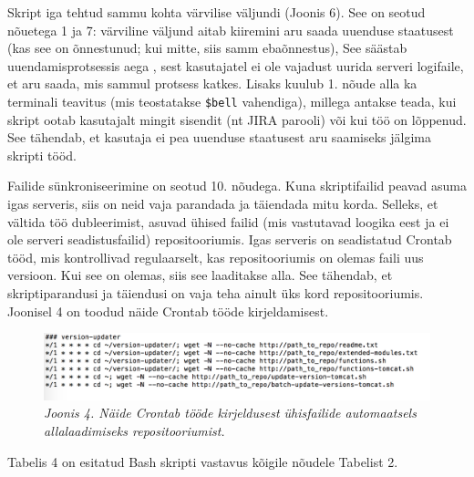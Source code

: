 \documentclass[12pt]{article}
\newcommand{\code}[1]{\texttt{#1}}
\begin{document}
   Skript iga tehtud sammu kohta värvilise väljundi (Joonis 6). See on seotud nõuetega 1 ja 7: värviline väljund aitab kiiremini aru saada uuenduse staatusest (kas see on õnnestunud; kui mitte, siis samm ebaõnnestus), See säästab uuendamisprotsessis aega , sest kasutajatel ei ole vajadust uurida serveri logifaile, et aru saada, mis sammul protsess katkes. Lisaks kuulub 1. nõude alla ka terminali teavitus (mis teostatakse \code{\$bell} vahendiga), millega antakse teada, kui skript ootab kasutajalt mingit sisendit (nt JIRA parooli) või kui töö on lõppenud. See tähendab, et kasutaja ei pea uuenduse staatusest aru saamiseks jälgima skripti tööd.
   
   Failide sünkroniseerimine on seotud 10. nõudega. Kuna skriptifailid peavad asuma igas serveris, siis on neid vaja parandada ja täiendada mitu korda. Selleks, et vältida töö dubleerimist, asuvad ühised failid (mis vastutavad loogika eest ja ei ole serveri seadistusfailid) repositooriumis. Igas serveris on seadistatud Crontab \cite{cron} tööd, mis kontrollivad regulaarselt, kas repositooriumis on olemas faili uus versioon. Kui see on olemas, siis see laaditakse alla. See tähendab, et skriptiparandusi ja täiendusi on vaja teha ainult üks kord repositooriumis. Joonisel 4 on toodud näide Crontab tööde kirjeldamisest.
   \begin{figure}[H]
     \begin{center} 
       \includegraphics[width=\textwidth]{screenshots/crontab.png}
       \caption*{\textit{Joonis 4. Näide Crontab tööde kirjeldusest ühisfailide automaatsels allalaadimiseks repositooriumist.}}
     \end{center}
   \end{figure}
   
   \newpage
   
    Tabelis 4 on esitatud Bash skripti vastavus kõigile nõudele Tabelist 2.
   
\end{document}
